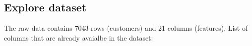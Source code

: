 \documentclass{article}
\begin{document}
\subsection{Explore dataset}
The raw data contains 7043 rows (customers) and 21 columns (features).
List of columns that are already avaialbe in the dataset:
\end{document}

